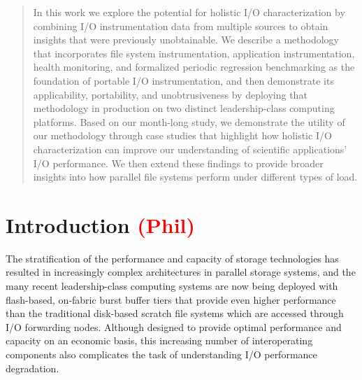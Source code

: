 \documentclass[conference,10pt,compsocconf]{IEEEtran}
\newcommand{\assign}[1]{\textcolor{red}{(#1)}}
\begin{document}
\begin{abstract}
In this work we explore the potential for holistic I/O characterization
by combining I/O instrumentation data from multiple sources to obtain
insights that were previously unobtainable. We describe a methodology that
incorporates file system instrumentation, application instrumentation,
health monitoring, and formalized periodic regression benchmarking as
the foundation of portable I/O instrumentation, and then demonstrate
its applicability, portability, and unobtrusiveness by deploying that
methodology in production on two distinct leadership-class computing
platforms. Based on our month-long study, we demonstrate the utility of our
methodology through case studies that highlight how holistic I/O
characterization can improve our understanding of scientific applications'
I/O performance. We then extend these findings to provide broader insights
into how parallel file systems perform under different types of load.

\end{abstract}

\section{Introduction \assign{Phil}} \label{sec:introduction}



The stratification of the performance and capacity of storage technologies has
resulted in increasingly complex architectures in parallel storage systems, and
the many recent leadership-class computing systems are now being deployed with
flash-based, on-fabric burst buffer tiers\cite{Henseler2016} that provide even higher performance
than the traditional disk-based scratch file systems which are accessed through
I/O forwarding nodes\cite{Bhimji2016}.  Although designed to provide optimal performance and
capacity on an economic basis, this increasing number of interoperating
components also complicates the task of understanding I/O performance
degradation.

\end{document}
